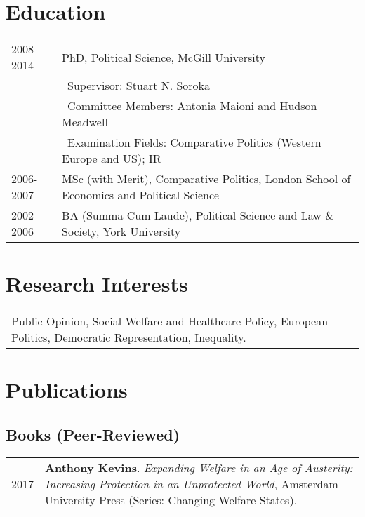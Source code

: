 \documentclass[letterpaper,fontsize=10pt]{scrartcl}
\begin{document}
	\section{Education}
	\vspace{-1.5em}
	\begin{tabularx}{\textwidth}{@{} l X @{} }
		2008-2014 & PhD, Political Science, McGill University\\
		& \textbullet\ Supervisor: Stuart N. Soroka\\
		& \textbullet\ Committee Members: Antonia Maioni and Hudson Meadwell\\
		& \textbullet\ Examination Fields: Comparative Politics (Western Europe and US); IR\\[1ex]
		2006-2007 & MSc (with Merit), Comparative Politics, London School of Economics and Political Science\\[1ex]
		2002-2006 & BA (Summa Cum Laude), Political Science and Law \& Society, York University\\
	\end{tabularx}

	\section{Research Interests}
	\vspace{-1.5em}
	\begin{tabularx}{\textwidth}{@{}X}
		Public Opinion, Social Welfare and Healthcare Policy, European Politics, Democratic Representation, Inequality.\\
	\end{tabularx}

	\section{Publications}

	\vspace{-.5em}
\subsection{Books (Peer-Reviewed)}
	\vspace{-1.5em}
	\begin{tabularx}{\textwidth}{@{} l X @{} }
		2017 & \textbf{Anthony Kevins}. \textit{Expanding Welfare in an Age of Austerity: Increasing Protection in an Unprotected World}, Amsterdam University Press (Series: Changing Welfare States).
	\end{tabularx}
\end{document}
